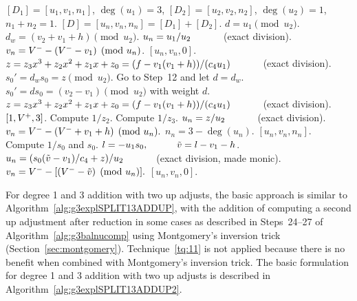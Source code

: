 \begin{algorithm}[H]
\caption{Genus 3 Split Model Degree 1 and 3 Addition with Up Adjust\label{alg:g3explSPLIT13ADDUP}}
\begin{algorithmic} [1]
\Require $[D_1] = [u_1,v_1,n_1]$, $\deg(u_1) = 3$, $[D_2] = [u_2,v_2,n_2]$, $\deg(u_2) = 1$, $n_1 + n_2 = 1$.
\Ensure $[D] = [u_n,v_n,n_n] = [D_1] + [D_2] $.
\algrule
\vspace{-2pt}
\State $d = u_1 \pmod{u_2}$.
    \State $d_w = (v_2 + v_1 + h) \pmod{u_2}$.
        \State $u_n = u_1/u_2 \quad\quad\quad$ (exact division).
        \State $v_n = V^{-} - (V^{-} - v_1) \pmod{u_n}$.
        \State \Return $[u_n,v_n,0]$.
    \EndIf
    \State $z = z_3x^3 + z_2x^2 + z_1x + z_0 = (f - v_1(v_1 + h))/(c_4u_1) \quad\quad\quad$ (exact division).  
    \State $s_0' = d_ws_0 = z \pmod{u_2}$.
    \State Go to Step~12 and let $d = d_w$.
\EndIf
\State $s_0' = ds_0 = (v_2 - v_1) \pmod{u_2}$ with weight $d$.
\State $z = z_3x^3 + z_2x^2 + z_1x + z_0 = (f - v_1(v_1 + h))/(c_4u_1) \quad\quad\quad$ (exact division).  
         \Return $[1,V^{+},3]$.
        \Else \hspace{3pt} Compute $1/z_2$.
        \EndIf
    \Else \hspace{3pt} Compute $1/z_3$.
    \EndIf
    \State $u_n = z/u_2 \quad\quad\quad$ (exact division).
    \State $v_n = V^{-} - (V^{-} + v_1 + h) \pmod{u_n}.$
    \State $n_n = 3 - \deg(u_n)$.
    \State \Return $[u_n,v_n,n_n]$.
\EndIf
\State Compute $1/s_0$ and $s_0$.
\State $l = -u_1s_0, \quad\quad\quad \tilde{v} = l - v_1 - h$.
\State $u_n = (s_0(\tilde{v} - v_1)/c_4 + z)/u_2 \quad\quad\quad$ (exact division, made monic).
\State $v_n = V^{-} - [(V^{-} - \tilde{v}) \pmod{u_n}].$ 
\State \Return $[u_n,v_n,0]$.
\vspace{-2pt}
\end{algorithmic}
\end{algorithm}



For degree 1 and 3 addition with two up adjusts, the basic approach is similar
to Algorithm~\ref{alg:g3explSPLIT13ADDUP}, with the addition of computing a
second up adjustment after reduction in some cases as described in Steps~24--27
of Algorithm~\ref{alg:g3balnucomp} using Montgomery's inversion trick
(Section~\ref{sec:montgomery}). Technique~\ref{tq:11} is not applied because
there is no benefit when combined with Montgomery's inversion trick. The basic
formulation for degree 1 and 3 addition with two up adjusts is described in
Algorithm~\ref{alg:g3explSPLIT13ADDUP2}.

